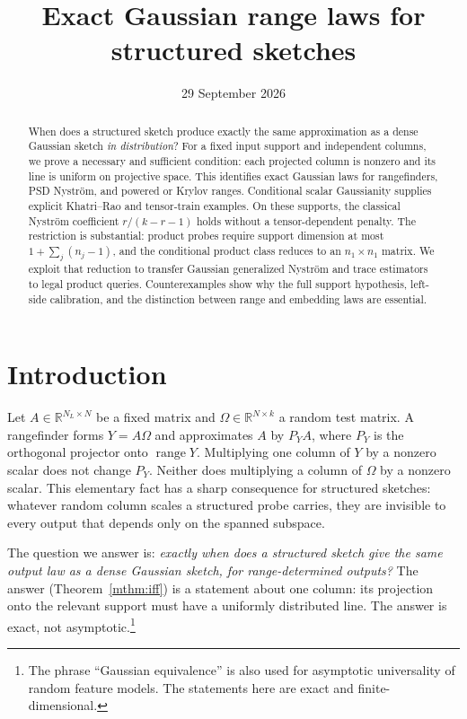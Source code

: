 \documentclass[11pt,a4paper]{article}
\title{Exact Gaussian range laws for structured sketches}
\author{}
\date{29 September 2026}
\theoremstyle{definition}
\theoremstyle{remark}
\numberwithin{equation}{section}
\newcommand{\R}{\mathbb R}
\newcommand{\range}{\operatorname{range}}
\begin{document}
\maketitle
\begin{abstract}
When does a structured sketch produce exactly the same approximation as a
dense Gaussian sketch \emph{in distribution}? For a fixed input support and
independent columns, we prove a necessary and sufficient condition: each
projected column is nonzero and its line is uniform on projective space.
This identifies exact Gaussian laws for rangefinders, PSD Nystr\"om, and
powered or Krylov ranges. Conditional scalar Gaussianity supplies explicit
Khatri--Rao and tensor-train examples. On these supports, the classical
Nystr\"om coefficient $r/(k-r-1)$ holds without a tensor-dependent penalty.
The restriction is substantial: product probes require support dimension at
most $1+\sum_j(n_j-1)$, and the conditional product class reduces to an
$n_1\times n_1$ matrix. We exploit that reduction to transfer Gaussian
generalized Nystr\"om and trace estimators to legal product queries.
Counterexamples show why the full support hypothesis, left-side calibration,
and the distinction between range and embedding laws are essential.
\end{abstract}

\tableofcontents

\section{Introduction}\label{sec:intro}

Let $A\in\R^{N_L\times N}$ be a fixed matrix and $\Omega\in\R^{N\times k}$ a
random test matrix. A rangefinder forms $Y=A\Omega$ and approximates $A$ by
$P_YA$, where $P_Y$ is the orthogonal projector onto $\range Y$.
Multiplying one column of $Y$ by a nonzero scalar does not change $P_Y$.
Neither does multiplying a column of $\Omega$ by a nonzero scalar. This
elementary fact has a sharp consequence for structured sketches: whatever
random column scales a structured probe carries, they are invisible to every
output that depends only on the spanned subspace.

The question we answer is: \emph{exactly when does a structured sketch give
the same output law as a dense Gaussian sketch, for range-determined
outputs?} The answer (Theorem~\ref{mthm:iff}) is a statement about one
column: its projection onto the relevant support must have a uniformly
distributed line. The answer is exact, not asymptotic.\footnote{The phrase
``Gaussian equivalence'' is also used for asymptotic universality of random
feature models. The statements here are exact and finite-dimensional.}
\end{document}
